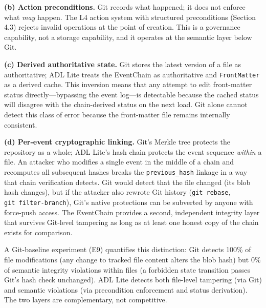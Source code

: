\textbf{(b) Action preconditions.} Git records what happened; it does not enforce what \emph{may} happen. The L4 action system with structured preconditions (Section 4.3) rejects invalid operations at the point of creation. This is a governance capability, not a storage capability, and it operates at the semantic layer below Git.

\textbf{(c) Derived authoritative state.} Git stores the latest version of a file as authoritative; ADL Lite treats the EventChain as authoritative and \texttt{FrontMatter} as a derived cache. This inversion means that any attempt to edit front-matter status directly---bypassing the event log---is detectable because the cached status will disagree with the chain-derived status on the next load. Git alone cannot detect this class of error because the front-matter file remains internally consistent.

\textbf{(d) Per-event cryptographic linking.} Git's Merkle tree protects the repository as a whole; ADL Lite's hash chain protects the event sequence \emph{within} a file. An attacker who modifies a single event in the middle of a chain and recomputes all subsequent hashes breaks the \texttt{previous\_hash} linkage in a way that chain verification detects. Git would detect that the file changed (its blob hash changes), but if the attacker also rewrote Git history (\texttt{git\ rebase}, \texttt{git\ filter-branch}), Git's native protections can be subverted by anyone with force-push access. The EventChain provides a second, independent integrity layer that survives Git-level tampering as long as at least one honest copy of the chain exists for comparison.

A Git-baseline experiment (E9) quantifies this distinction: Git detects 100\% of file modifications (any change to tracked file content alters the blob hash) but 0\% of semantic integrity violations within files (a forbidden state transition passes Git's hash check unchanged). ADL Lite detects both file-level tampering (via Git) and semantic violations (via precondition enforcement and status derivation). The two layers are complementary, not competitive.
